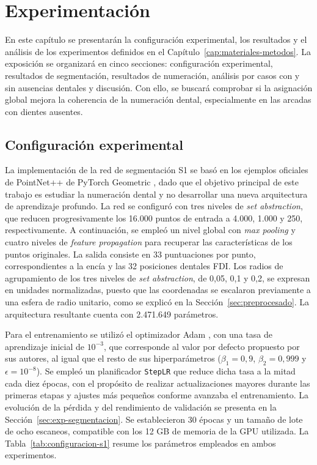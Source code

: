 \chapter{Experimentación}
\label{cap:experimentacion}

En este capítulo se presentarán la configuración experimental, los resultados y el análisis de los experimentos definidos en el Capítulo~\ref{cap:materiales-metodos}. La exposición se organizará en cinco secciones: configuración experimental, resultados de segmentación, resultados de numeración, análisis por casos con y sin ausencias dentales y discusión. Con ello, se buscará comprobar si la asignación global mejora la coherencia de la numeración dental, especialmente en las arcadas con dientes ausentes.

\section{Configuración experimental}
\label{sec:exp-configuracion}

La implementación de la red de segmentación S1 se basó en los ejemplos oficiales de PointNet++ de PyTorch Geometric \cite{feyFastGraphRepresentation2019}, dado que el objetivo principal de este trabajo es estudiar la numeración dental y no desarrollar una nueva arquitectura de aprendizaje profundo. La red se configuró con tres niveles de \textit{set abstraction}, que reducen progresivamente los 16.000 puntos de entrada a 4.000, 1.000 y 250, respectivamente. A continuación, se empleó un nivel global con \textit{max pooling} y cuatro niveles de \textit{feature propagation} para recuperar las características de los puntos originales. La salida consiste en 33 puntuaciones por punto, correspondientes a la encía y las 32 posiciones dentales FDI. Los radios de agrupamiento de los tres niveles de \textit{set abstraction}, de 0{,}05, 0{,}1 y 0{,}2, se expresan en unidades normalizadas, puesto que las coordenadas se escalaron previamente a una esfera de radio unitario, como se explicó en la Sección~\ref{sec:preprocesado}. La arquitectura resultante cuenta con 2.471.649 parámetros.

Para el entrenamiento se utilizó el optimizador Adam \cite{kingmaAdamMethodStochastic2015}, con una tasa de aprendizaje inicial de $10^{-3}$, que corresponde al valor por defecto propuesto por sus autores, al igual que el resto de sus hiperparámetros ($\beta_1 = 0{,}9$, $\beta_2 = 0{,}999$ y $\epsilon = 10^{-8}$). Se empleó un planificador \texttt{StepLR} que reduce dicha tasa a la mitad cada diez épocas, con el propósito de realizar actualizaciones mayores durante las primeras etapas y ajustes más pequeños conforme avanzaba el entrenamiento. La evolución de la pérdida y del rendimiento de validación se presenta en la Sección~\ref{sec:exp-segmentacion}. Se establecieron 30 épocas y un tamaño de lote de ocho escaneos, compatible con los 12 GB de memoria de la GPU utilizada. La Tabla~\ref{tab:configuracion-s1} resume los parámetros empleados en ambos experimentos.

